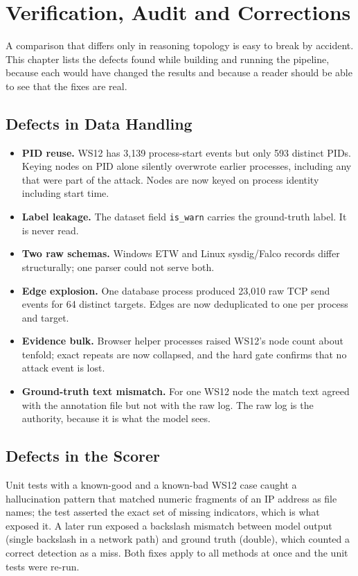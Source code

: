 \chapter{Verification, Audit and Corrections}
\label{ch:audit}

A comparison that differs only in reasoning topology is easy to break by accident. This chapter lists the defects found while building and running the pipeline, because each would have changed the results and because a reader should be able to see that the fixes are real.

\section{Defects in Data Handling}
\begin{itemize}
\item \textbf{PID reuse.} WS12 has 3,139 process-start events but only 593 distinct PIDs. Keying nodes on PID alone silently overwrote earlier processes, including any that were part of the attack. Nodes are now keyed on process identity including start time.
\item \textbf{Label leakage.} The dataset field \texttt{is\_warn} carries the ground-truth label. It is never read.
\item \textbf{Two raw schemas.} Windows ETW and Linux sysdig/Falco records differ structurally; one parser could not serve both.
\item \textbf{Edge explosion.} One database process produced 23,010 raw TCP send events for 64 distinct targets. Edges are now deduplicated to one per process and target.
\item \textbf{Evidence bulk.} Browser helper processes raised WS12's node count about tenfold; exact repeats are now collapsed, and the hard gate confirms that no attack event is lost.
\item \textbf{Ground-truth text mismatch.} For one WS12 node the match text agreed with the annotation file but not with the raw log. The raw log is the authority, because it is what the model sees.
\end{itemize}

\section{Defects in the Scorer}
Unit tests with a known-good and a known-bad WS12 case caught a hallucination pattern that matched numeric fragments of an IP address as file names; the test asserted the exact set of missing indicators, which is what exposed it. A later run exposed a backslash mismatch between model output (single backslash in a network path) and ground truth (double), which counted a correct detection as a miss. Both fixes apply to all methods at once and the unit tests were re-run.

